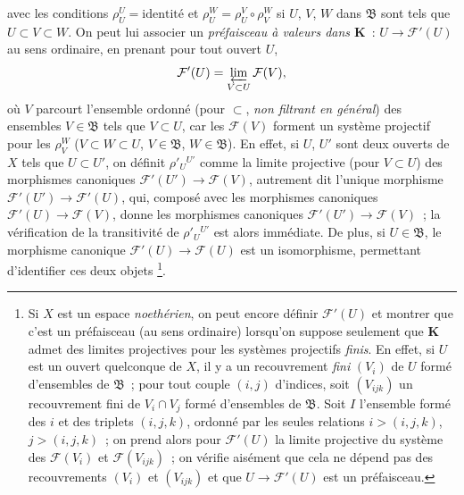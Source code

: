 \begin{env}[3.2.1]
avec les conditions $\rho_U^U=\text{identité}$ et
$\rho_U^W=\rho_U^V\circ\rho_V^W$ si $U$, $V$, $W$ dans $\mathfrak{B}$ sont
tels que $U\subset V\subset W$. On peut lui associer un \emph{préfaisceau à
valeurs dans $\mathbf{K}$}~: $U\to\mathcal{F}'(U)$ au sens ordinaire, en
prenant pour tout ouvert $U$,
\[
  \mathcal{F}'(U)=\varprojlim_{V\subset U}\mathcal{F}(V),
\]
où $V$ parcourt l'ensemble ordonné (pour $\subset$, \emph{non filtrant en
général}) des ensembles $V\in\mathfrak{B}$ tels que $V\subset U$, car les
$\mathcal{F}(V)$ forment un système projectif pour les $\rho_V^W$
($V\subset W\subset U$, $V\in\mathfrak{B}$, $W\in\mathfrak{B}$). En effet,
si $U$, $U'$ sont deux ouverts de $X$ tels que $U\subset U'$, on définit
$\rho'_U{}^{U'}$ comme la limite projective (pour $V\subset U$) des morphismes
canoniques $\mathcal{F}'(U')\to\mathcal{F}(V)$, autrement dit l'unique
morphisme $\mathcal{F}'(U')\to\mathcal{F}'(U)$, qui, composé avec les
morphismes canoniques $\mathcal{F}'(U)\to\mathcal{F}(V)$, donne les morphismes
canoniques $\mathcal{F}'(U')\to\mathcal{F}(V)$~; la vérification de la
transitivité de $\rho'_U{}^{U'}$ est alors immédiate. De plus, si
$U\in\mathfrak{B}$, le morphisme canonique
$\mathcal{F}'(U)\to\mathcal{F}(U)$ est un isomorphisme, permettant d'identifier
ces deux objets%
\footnote{Si $X$ est un espace \emph{noethérien}, on peut encore définir
$\mathcal{F}'(U)$ et montrer que c'est un préfaisceau (au sens ordinaire)
lorsqu'on suppose seulement que $\mathbf{K}$ admet des limites projectives
pour les systèmes projectifs \emph{finis}. En effet, si $U$ est un ouvert
quelconque de $X$, il y a un recouvrement \emph{fini} $(V_i)$ de $U$ formé
d'ensembles de $\mathfrak{B}$~; pour tout couple $(i,j)$ d'indices, soit
$(V_{ijk})$ un recouvrement fini de $V_i\cap V_j$ formé d'ensembles de
$\mathfrak{B}$. Soit $I$ l'ensemble formé des $i$ et des triplets $(i,j,k)$,
ordonné par les seules relations $i>(i,j,k)$, $j>(i,j,k)$~; on prend alors
pour $\mathcal{F}'(U)$ la limite projective du système des $\mathcal{F}(V_i)$
et $\mathcal{F}(V_{ijk})$~; on vérifie aisément que cela ne dépend pas des
recouvrements $(V_i)$ et $(V_{ijk})$ et que $U\to\mathcal{F}'(U)$ est un
préfaisceau.}.
\end{env}

